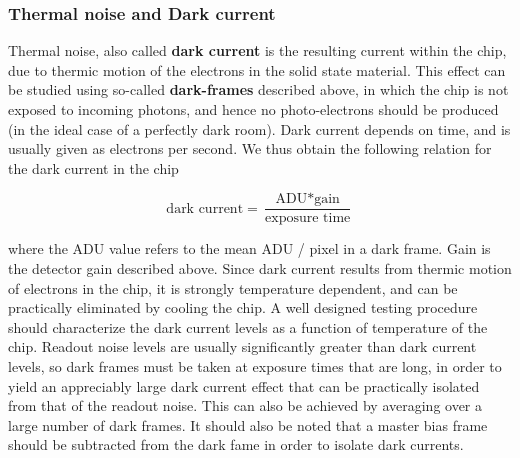 \documentclass[../main.tex]{subfiles}
\begin{document}
	\subsubsection{Thermal noise and Dark current}
	Thermal noise, also called \textbf{dark current} is the resulting current within the chip, due to thermic motion of the electrons in the solid state material. This effect can be studied using so-called \textbf{dark-frames} described above, in which the chip is not exposed to incoming photons, and hence no photo-electrons should be produced (in the ideal case of a perfectly dark room). Dark current depends on time, and is usually given as electrons per second. We thus obtain the following relation for the dark current in the chip
	
	\begin{equation}\label{darkcurrenteq}
		\text{dark current} = \frac{\text{ADU} * \text{gain}}{\text{exposure time}}
	\end{equation}

	where the ADU value refers to the mean ADU / pixel in a dark frame. Gain is the detector gain described above. Since dark current results from thermic motion of electrons in the chip, it is strongly temperature dependent, and can be practically eliminated by cooling the chip. A well designed testing procedure should characterize the dark current levels as a function of temperature of the chip. Readout noise levels are usually significantly greater than dark current levels, so dark frames must be taken at exposure times that are long, in order to yield an appreciably large dark current effect that can be practically isolated from that of the readout noise. This can also be achieved by averaging over a large number of dark frames. It should also be noted that a master bias frame should be subtracted from the dark fame in order to isolate dark currents. 
	
\end{document}
